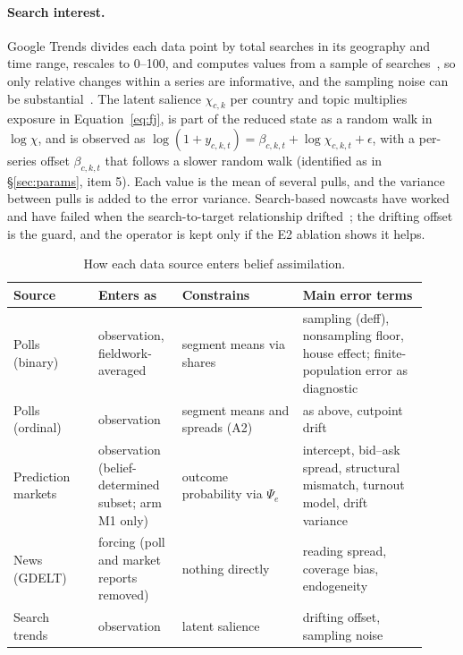 \documentclass[10pt]{article}
\theoremstyle{remark}
\begin{document}
\paragraph{Search interest.} Google Trends divides each data point by total searches in its geography and time range, rescales to 0--100, and computes values from a sample of searches~\cite{googletrendsfaq}, so only relative changes within a series are informative, and the sampling noise can be substantial~\cite{eichenauer2022}. The latent salience $\chi_{c,k}$ per country and topic multiplies exposure in Equation~\eqref{eq:fj}, is part of the reduced state as a random walk in $\log\chi$, and is observed as $\log(1+y_{c,k,t}) = \beta_{c,k,t} + \log \chi_{c,k,t} + \epsilon$, with a per-series offset $\beta_{c,k,t}$ that follows a slower random walk (identified as in \S\ref{sec:params}, item 5). Each value is the mean of several pulls, and the variance between pulls is added to the error variance. Search-based nowcasts have worked~\cite{choi2012,ginsberg2009} and have failed when the search-to-target relationship drifted~\cite{lazer2014}; the drifting offset is the guard, and the operator is kept only if the E2 ablation shows it helps.

\begin{table}[t]
\centering
\small
\begin{tabular}{@{}>{\raggedright\arraybackslash}p{0.19\linewidth}>{\raggedright\arraybackslash}p{0.17\linewidth}>{\raggedright\arraybackslash}p{0.27\linewidth}>{\raggedright\arraybackslash}p{0.29\linewidth}@{}}
\toprule
Source & Enters as & Constrains & Main error terms \\
\midrule
Polls (binary) & observation, fieldwork-averaged & segment means via shares & sampling (deff), nonsampling floor, house effect; finite-population error as diagnostic \\
Polls (ordinal) & observation & segment means and spreads (A2) & as above, cutpoint drift \\
Prediction markets & observation (belief-determined subset; arm M1 only) & outcome probability via $\Psi_e$ & intercept, bid--ask spread, structural mismatch, turnout model, drift variance \\
News (GDELT) & forcing (poll and market reports removed) & nothing directly & reading spread, coverage bias, endogeneity \\
Search trends & observation & latent salience & drifting offset, sampling noise \\
\bottomrule
\end{tabular}
\caption{How each data source enters belief assimilation.}
\label{tab:obs}
\end{table}
\end{document}
